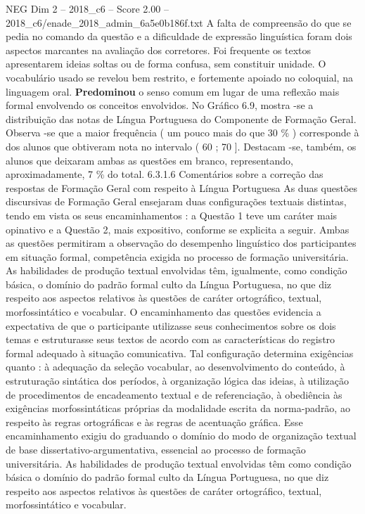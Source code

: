 \begin{textsample}{NEG Dim 2 – 2018\_c6 – Score 2.00 – 2018\_c6/enade\_2018\_admin\_6a5e0b186f.txt}
A falta de compreensão do que se pedia no comando da questão e a dificuldade de expressão linguística foram dois aspectos marcantes na avaliação dos corretores.
Foi frequente os textos apresentarem ideias soltas ou de forma confusa, sem constituir unidade.
O vocabulário usado se revelou bem restrito, e fortemente apoiado no coloquial, na linguagem oral. \textbf{Predominou} o senso comum em lugar de uma reflexão mais formal envolvendo os conceitos envolvidos.
No Gráfico 6.9, mostra -se a distribuição das notas de Língua Portuguesa do Componente de Formação Geral.
Observa -se que a maior frequência ( um pouco mais do que 30 \% ) corresponde à dos alunos que obtiveram nota no intervalo ( 60 ; 70 ].
Destacam -se, também, os alunos que deixaram ambas as questões em branco, representando, aproximadamente, 7 \% do total. 6.3.1.6 Comentários sobre a correção das respostas de Formação Geral com respeito à Língua Portuguesa As duas questões discursivas de Formação Geral ensejaram duas configurações textuais distintas, tendo em vista os seus encaminhamentos : a Questão 1 teve um caráter mais opinativo e a Questão 2, mais expositivo, conforme se explicita a seguir.
Ambas as questões permitiram a observação do desempenho linguístico dos participantes em situação formal, competência exigida no processo de formação universitária.
As habilidades de produção textual envolvidas têm, igualmente, como condição básica, o domínio do padrão formal culto da Língua Portuguesa, no que diz respeito aos aspectos relativos às questões de caráter ortográfico, textual, morfossintático e vocabular.
O encaminhamento das questões evidencia a expectativa de que o participante utilizasse seus conhecimentos sobre os dois temas e estruturasse seus textos de acordo com as características do registro formal adequado à situação comunicativa.
Tal configuração determina exigências quanto : à adequação da seleção vocabular, ao desenvolvimento do conteúdo, à estruturação sintática dos períodos, à organização lógica das ideias, à utilização de procedimentos de encadeamento textual e de referenciação, à obediência às exigências morfossintáticas próprias da modalidade escrita da norma-padrão, ao respeito às regras ortográficas e às regras de acentuação gráfica.
Esse encaminhamento exigiu do graduando o domínio do modo de organização textual de base dissertativo-argumentativa, essencial ao processo de formação universitária.
As habilidades de produção textual envolvidas têm como condição básica o domínio do padrão formal culto da Língua Portuguesa, no que diz respeito aos aspectos relativos às questões de caráter ortográfico, textual, morfossintático e vocabular.

\end{textsample}
